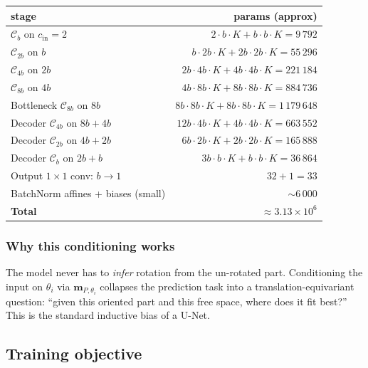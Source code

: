 \documentclass[11pt]{article}
\begin{document}
\begin{center}
\begin{tabular}{lr}
  \toprule
  stage & params (approx) \\
  \midrule
  $\mathcal{C}_b$ on $c_\text{in}=2$           & $2 \cdot b \cdot K + b \cdot b \cdot K = 9\,792$ \\
  $\mathcal{C}_{2b}$ on $b$                    & $b \cdot 2b \cdot K + 2b \cdot 2b \cdot K = 55\,296$ \\
  $\mathcal{C}_{4b}$ on $2b$                   & $2b \cdot 4b \cdot K + 4b \cdot 4b \cdot K = 221\,184$ \\
  $\mathcal{C}_{8b}$ on $4b$                   & $4b \cdot 8b \cdot K + 8b \cdot 8b \cdot K = 884\,736$ \\
  Bottleneck $\mathcal{C}_{8b}$ on $8b$        & $8b \cdot 8b \cdot K + 8b \cdot 8b \cdot K = 1\,179\,648$ \\
  Decoder $\mathcal{C}_{4b}$ on $8b+4b$        & $12b \cdot 4b \cdot K + 4b \cdot 4b \cdot K = 663\,552$ \\
  Decoder $\mathcal{C}_{2b}$ on $4b+2b$        & $6b \cdot 2b \cdot K + 2b \cdot 2b \cdot K = 165\,888$ \\
  Decoder $\mathcal{C}_{b}$ on $2b+b$          & $3b \cdot b \cdot K + b \cdot b \cdot K = 36\,864$ \\
  Output $1{\times}1$ conv: $b \to 1$          & $32 + 1 = 33$ \\
  BatchNorm affines + biases (small)           & $\sim 6\,000$ \\
  \midrule
  \textbf{Total}                               & $\approx 3.13 \times 10^6$ \\
  \bottomrule
\end{tabular}
\end{center}

\subsubsection{Why this conditioning works}

The model never has to \emph{infer} rotation from the un-rotated part.  Conditioning the input on $\theta_i$ via $\mathbf{m}_{P,\theta_i}$ collapses the prediction task into a translation-equivariant question: ``given this oriented part and this free space, where does it fit best?'' This is the standard inductive bias of a U-Net.

\subsection{Training objective}
\end{document}
